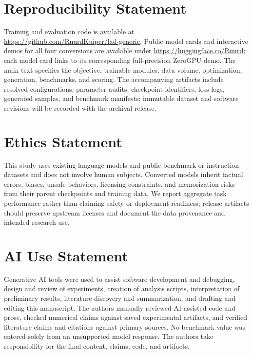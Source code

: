 \documentclass{article}
\begin{document}
\section*{Reproducibility Statement}

Training and evaluation code is available at \url{https://github.com/RuurdKuiper/lad-generic}. Public model cards and interactive demos for all four conversions are available under \url{https://huggingface.co/Ruurd}; each model card links to its corresponding full-precision ZeroGPU demo. The main text specifies the objective, trainable modules, data volume, optimization, generation, benchmarks, and scoring. The accompanying artifacts include resolved configurations, parameter audits, checkpoint identifiers, loss logs, generated samples, and benchmark manifests; immutable dataset and software revisions will be recorded with the archival release.

\section*{Ethics Statement}

This study uses existing language models and public benchmark or instruction datasets and does not involve human subjects. Converted models inherit factual errors, biases, unsafe behaviors, licensing constraints, and memorization risks from their parent checkpoints and training data. We report aggregate task performance rather than claiming safety or deployment readiness; release artifacts should preserve upstream licenses and document the data provenance and intended research use.

\section*{AI Use Statement}

Generative AI tools were used to assist software development and debugging, design and review of experiments, creation of analysis scripts, interpretation of preliminary results, literature discovery and summarization, and drafting and editing this manuscript. The authors manually reviewed AI-assisted code and prose, checked numerical claims against saved experimental artifacts, and verified literature claims and citations against primary sources. No benchmark value was entered solely from an unsupported model response. The authors take responsibility for the final content, claims, code, and artifacts.



\end{document}
